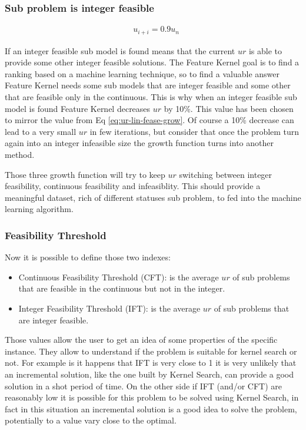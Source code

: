 \subsubsection*{Sub problem is integer feasible}
    \begin{align}
        &u_{i+i} = 0.9 u_{n} \label{eq:ur-fease-grow}
    \end{align}


    If an integer feasible sub model is found means that the current $ur$ is able to provide some other integer feasible solutions. 
    The Feature Kernel goal is to find a ranking based on a machine learning technique, so to find a valuable answer Feature Kernel needs
    some sub models that are integer feasible and some other that are feasible only in the continuous. This is why when an integer feasible
    sub model is found Feature Kernel decreases $ur$ by 10\%. This value has been chosen to mirror the value from Eq \ref{eq:ur-lin-fease-grow}.
    Of course a 10\% decrease can lead to a very small $ur$ in few iterations, but consider that once the problem turn again into an integer infeasible 
    size the growth function turns into another method.


Those three growth function will try to keep $ur$ switching between integer feasibility, continuous feasibility and infeasiblity. This should provide 
a meaningful dataset, rich of different statuses sub problem, to fed into the machine learning algorithm. 


\subsubsection{Feasibility Threshold}

Now it is possible to define those two indexes:
\begin{itemize}
    \item Continuous Feasibility Threshold (CFT): is the average $ur$ of sub problems that are feasible in the continuous but not in the integer.
    \item Integer Feasibility Threshold (IFT): is the average $ur$ of sub problems that are integer feasible.
\end{itemize}


Those values allow the user to get an idea of some properties of the specific instance. They allow to understand if the problem is suitable for kernel search or not. 
For example is it happens that IFT is very close to 1 it is very unlikely that an incremental solution, like the one built by Kernel Search, can provide a good solution in
a shot period of time. On the other side if IFT (and/or CFT) are reasonably low it is possible for this problem to be solved using Kernel Search, in fact in this situation
an incremental solution is a good idea to solve the problem, potentially to a value vary close to the optimal. 


